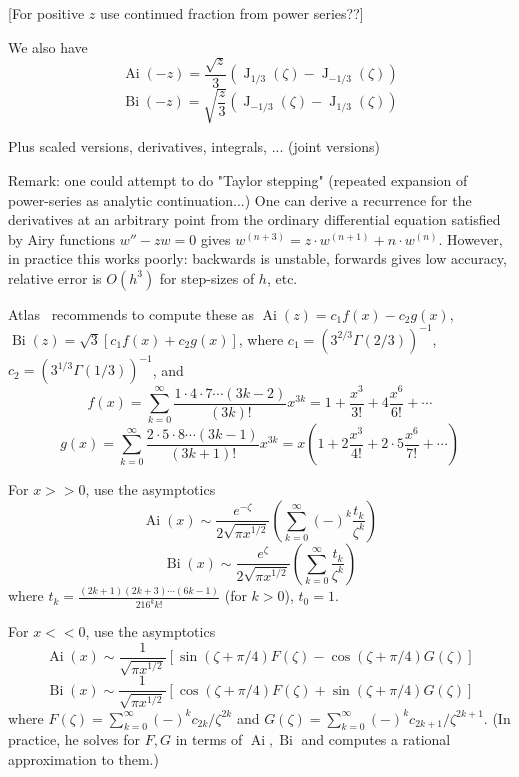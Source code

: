 \documentclass[10pt,dvipdfmx,letterpaper,twoside]{article}
\let\O=\operatorname
\newenvironment{implementation}{\noindent\begin{framed}}{\end{framed}}
\let\Gam=\Gamma
\begin{document}
[For positive $z$ use continued fraction from power series??]

We also have
\[ \O{Ai}(-z) = \frac{\sqrt{z}}{3}\left( \O{J}_{1/3}(\zeta) - \O{J}_{-1/3}(\zeta) \right) \]
\[ \O{Bi}(-z) = \sqrt{\frac{z}{3}}\left( \O{J}_{-1/3}(\zeta) - \O{J}_{1/3}(\zeta) \right) \]

Plus scaled versions, derivatives, integrals, ...
(joint versions)

Remark: one could attempt to do "Taylor stepping" (repeated expansion of power-series as analytic continuation...)
One can derive a recurrence for the derivatives at an arbitrary point from the ordinary differential equation satisfied
by Airy functions $w'' - zw = 0$ gives $w^{(n+3)} = z\cdot w^{(n+1)} + n\cdot w^{(n)}$.  However, in practice this works
poorly: backwards is unstable, forwards gives low accuracy, relative error is $O(h^3)$ for step-sizes of $h$, etc.

\begin{implementation}
Atlas~\cite{atlas:thompson} recommends to compute these as
$\O{Ai}(z) = c_1 f(x) - c_2 g(x)$, $\O{Bi}(z) = \sqrt3[c_1 f(x) + c_2 g(x)]$,
where $c_1 = (3^{2/3}\Gam(2/3))^{-1}$, $c_2 = (3^{1/3}\Gam(1/3))^{-1}$, and
\[ f(x) = \sum_{k=0}^\infty \frac{1\cdot4\cdot7\cdots(3k-2)}{(3k)!}x^{3k} = 1 + \frac{x^3}{3!} + 4\frac{x^6}{6!} + \cdots \]
\[ g(x) = \sum_{k=0}^\infty \frac{2\cdot5\cdot8\cdots(3k-1)}{(3k+1)!}x^{3k} = x(1 + 2\frac{x^3}{4!} + 2\cdot5\frac{x^6}{7!} + \cdots) \]

For $x>>0$, use the asymptotics
\[ \O{Ai}(x) \sim \frac{e^{-\zeta}}{2\sqrt{\pi x^{1/2}}}\left(\sum_{k=0}^\infty(-)^k\frac{t_k}{\zeta^k}\right) \]
\[ \O{Bi}(x) \sim \frac{e^{\zeta}}{2\sqrt{\pi x^{1/2}}}\left(\sum_{k=0}^\infty\frac{t_k}{\zeta^k}\right) \]
where $t_k = \frac{(2k+1)(2k+3)\cdots(6k-1)}{216^k k!}$ (for $k>0$), $t_0=1$.

For $x<<0$, use the asymptotics
\[ \O{Ai}(x) \sim \frac{1}{\sqrt{\pi x^{1/2}}}\left[ \sin(\zeta+\pi/4) F(\zeta) - \cos(\zeta+\pi/4) G(\zeta) \right] \]
\[ \O{Bi}(x) \sim \frac{1}{\sqrt{\pi x^{1/2}}}\left[ \cos(\zeta+\pi/4) F(\zeta) + \sin(\zeta+\pi/4) G(\zeta) \right] \]
where $F(\zeta) = \sum_{k=0}^\infty (-)^k c_{2k} / \zeta^{2k}$ and $G(\zeta) = \sum_{k=0}^\infty (-)^k c_{2k+1} / \zeta^{2k+1}$.
(In practice, he solves for $F, G$ in terms of $\O{Ai}, \O{Bi}$ and computes a rational approximation to them.)
\end{implementation}
\end{document}
